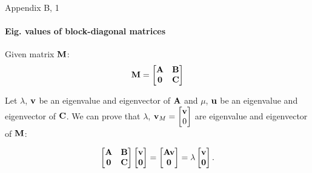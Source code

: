 \documentclass{beamer}
\begin{document}
\begin{frame}{Appendix B, 1}
		\framesubtitle{Eig. values of block-diagonal matrices}
	\begin{flushleft}
		
		Given matrix $\mathbf{M}$:
		\begin{align}
			\mathbf{M} = 
			\begin{bmatrix}
				\mathbf{A} & \mathbf{B} \\ \mathbf{0} & \mathbf{C}
			\end{bmatrix}
		\end{align}
		
		Let $\lambda$, $\mathbf{v}$ be an eigenvalue and eigenvector of $\mathbf{A}$ and $\mu$, $\mathbf{u}$ be an eigenvalue and eigenvector of $\mathbf{C}$. We can prove that $\lambda$, $\mathbf{v}_M = \begin{bmatrix}
			\mathbf{v} \\ 0
		\end{bmatrix}$ are eigenvalue and eigenvector of $\mathbf{M}$:
	
		\begin{align}
			\begin{bmatrix}
				\mathbf{A} & \mathbf{B} \\ \mathbf{0} & \mathbf{C}
			\end{bmatrix}
		\begin{bmatrix}
			\mathbf{v} \\ \mathbf{0}
		\end{bmatrix}
	=
	\begin{bmatrix}
		\mathbf{A}\mathbf{v} \\ \mathbf{0}
	\end{bmatrix}
	=
	\lambda
	\begin{bmatrix}
		\mathbf{v} \\ \mathbf{0}
	\end{bmatrix}.
		\end{align}
		
	\end{flushleft}
\end{frame}
\end{document}
